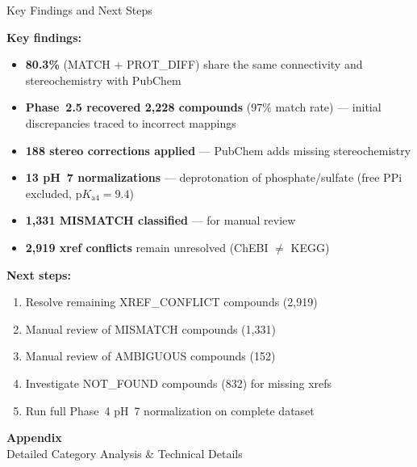 \documentclass[aspectratio=169,11pt]{beamer}
\begin{document}
\begin{frame}{Key Findings and Next Steps}

\textbf{Key findings:}\small
\begin{itemize}\setlength\itemsep{0pt}
  \item \textbf{80.3\%} (MATCH + PROT\_DIFF) share the same
        connectivity and stereochemistry with PubChem
  \item \textbf{Phase~2.5 recovered 2,228 compounds} (97\% match rate) ---
        initial discrepancies traced to incorrect mappings
  \item \textbf{188 stereo corrections applied} --- PubChem adds missing
        stereochemistry
  \item \textbf{13 pH~7 normalizations} --- deprotonation of phosphate/sulfate
        (free PPi excluded, $\text{p}K_{\text{a}4}{=}9.4$)
  \item \textbf{1,331 MISMATCH classified} --- for manual review
  \item \textbf{2,919 xref conflicts} remain unresolved (ChEBI $\neq$ KEGG)
\end{itemize}

\smallskip
\textbf{Next steps:}\small
\begin{enumerate}\setlength\itemsep{0pt}
  \item Resolve remaining XREF\_CONFLICT compounds (2,919)
  \item Manual review of MISMATCH compounds (1,331)
  \item Manual review of AMBIGUOUS compounds (152)
  \item Investigate NOT\_FOUND compounds (832) for missing xrefs
  \item Run full Phase~4 pH~7 normalization on complete dataset
\end{enumerate}

\end{frame}


\appendix
\begin{frame}
\centering
\vfill
{\Large \textbf{Appendix}}\\[6pt]
{\normalsize Detailed Category Analysis \& Technical Details}
\vfill
\end{frame}
\end{document}
